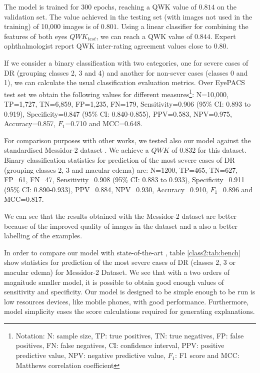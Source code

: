 The model is trained for 300 epochs, reaching a QWK value of $0.814$ on the validation set. The value achieved in the testing set (with images not used in the training) of 10,000 images is of $0.801$. Using a linear classifier for combining the features of both eyes $QWK_{test}$, we can reach a QWK value of $0.844$. Expert ophthalmologist report QWK inter-rating agreement values close to $0.80$. 

If we consider a binary classification with two categories, one for severe cases of DR (grouping classes 2, 3 and 4) and another for non-sever cases (classes 0 and 1), we can calculate the usual classification evaluation metrics. Over EyePACS test set we obtain the following values for different measures\footnote{\label{class2:footn:notation} Notation: N: sample size, TP: true positives, TN: true negatives, FP: false positives, FN: false negatives, CI: confidence interval, PPV: positive predictive value, NPV: negative predictive value, $F_1$: F1 score and MCC: Matthews correlation coefficient}: N=10,000, TP=1,727, TN=6,859, FP=1,235, FN=179, Sensitivity=0.906 (95\% CI: 0.893 to 0.919), Specificity=0.847 (95\% CI: 0.840-0.855), PPV=0.583, NPV=0.975, Accuracy=0.857, $F_1$=0.710 and MCC=0.648.

For comparison purposes with other works, we tested also our model against the standardised Messidor-2 dataset \citep{decenciere_feedback_2014}. We achieve a $QWK$ of $0.832$ for this dataset. Binary classification statistics for prediction of the most severe cases of DR (grouping classes 2, 3 and macular edema) are: N=1200, TP=465, TN=627, FP=61, FN=47, Sensitivity=0.908 (95\% CI: 0.883 to 0.933), Specificity=0.911 (95\% CI: 0.890-0.933), PPV=0.884, NPV=0.930, Accuracy=0.910, $F_1$=0.896 and MCC=0.817. 

We can see that the results obtained with the Messidor-2 dataset are better because of the improved quality of images in the dataset and a also a better labelling of the examples.


In order to compare our model with  state-of-the-art \citep{doi:10.1001/jama.2016.17216}, table \ref{class2:tab:bench} show statistics for prediction of the most severe cases of DR (classes 2, 3 or macular edema) for Messidor-2 Dataset. We see that with a two orders of magnitude smaller model, it is possible to obtain good enough values of sensitivity and specificity. Our model is designed to be simple enough to be run is low resources devices, like mobile phones, with good performance. Furthermore, model simplicity eases the score calculations required for generating explanations.

